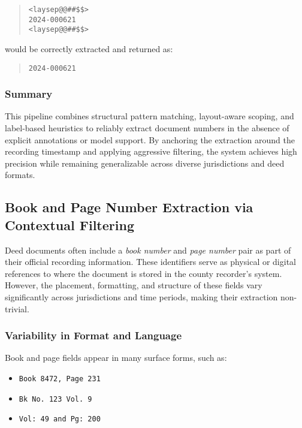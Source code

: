 \documentclass{article}
\begin{document}
\begin{quote}
\texttt{<laysep@@\#\#\$\$>\\2024-000621\\<laysep@@\#\#\$\$>}
\end{quote}

would be correctly extracted and returned as:

\begin{quote}
\texttt{2024-000621}
\end{quote}

\subsubsection{Summary}

This pipeline combines structural pattern matching, layout-aware scoping, and label-based heuristics to reliably extract document numbers in the absence of explicit annotations or model support. By anchoring the extraction around the recording timestamp and applying aggressive filtering, the system achieves high precision while remaining generalizable across diverse jurisdictions and deed formats.

\subsection{Book and Page Number Extraction via Contextual Filtering}

Deed documents often include a \textit{book number} and \textit{page number} pair as part of their official recording information. These identifiers serve as physical or digital references to where the document is stored in the county recorder’s system. However, the placement, formatting, and structure of these fields vary significantly across jurisdictions and time periods, making their extraction non-trivial.

\subsubsection{Variability in Format and Language}

Book and page fields appear in many surface forms, such as:

\begin{itemize}
    \item \texttt{Book 8472, Page 231}
    \item \texttt{Bk No. 123 Vol. 9}
    \item \texttt{Vol: 49 and Pg: 200}
\end{itemize}
\end{document}
